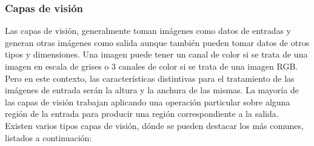 \documentclass[a4paper, 12pt, spanish, chapterprefix, numbers=noenddot]{book}
\begin{document}
\subsubsection{Capas de visión}\label{CapasVision}

Las capas de visión, generalmente toman imágenes como datos de entradas y generan otras imágenes como salida aunque también pueden tomar datos de otros tipos y dimensiones. Una imagen puede tener un canal de color si se trata de una imagen en escala de grises o 3 canales de color si se trata de una imagen RGB. Pero en este contexto, las características distintivas para el tratamiento de las imágenes de entrada serán la altura y la anchura de las mismas. La mayoría de las capas de visión trabajan aplicando una operación particular sobre alguna región de la entrada para producir una región correspondiente a la salida.\\

Existen varios tipos capas de visión, dónde se pueden destacar los más comunes, listados a continuación:
\end{document}
